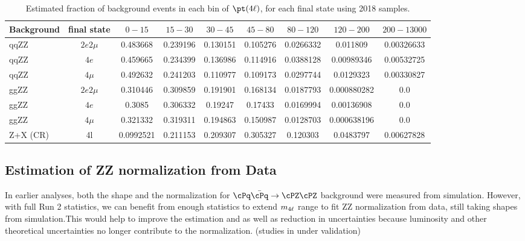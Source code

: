 \begin{table}[!h!tb]
\begin{center}
\scriptsize
    \caption{
        Estimated fraction of background events in each bin of $\pt(4\ell)$, for each final state using 2018 samples.
\label{tab:fractions_pT4l}
}
\begin{tabular}{|l|c|c|c|c|c|c|c|c|}
\hline
Background & final state & $0-15$ & $15-30$ & $30-45$ & $45-80$ & $80-120$ & $120-200$ & $200-13000$ \\ \hline
qqZZ& $2e2\mu$  & 0.483668  & 0.239196  & 0.130151  & 0.105276 & 0.0266332  & 0.011809  & 0.00326633 \\
qqZZ& $4e$  & 0.459665  & 0.234399  & 0.136986  & 0.114916 & 0.0388128  & 0.00989346  & 0.00532725 \\
qqZZ& $4\mu$  & 0.492632  & 0.241203  & 0.110977  & 0.109173 & 0.0297744  & 0.0129323  & 0.00330827 \\
\hline
ggZZ& $2e2\mu$  &  0.310446 & 0.309859  & 0.191901  & 0.168134 & 0.0187793  & 0.000880282  & 0.0 \\
ggZZ& $4e$  & 0.3085  & 0.306332  & 0.19247  & 0.17433 & 0.0169994  & 0.00136908  & 0.0 \\
ggZZ& $4\mu$  & 0.321332  & 0.319311  & 0.194863  & 0.150987 & 0.0128703  & 0.000638196  & 0.0 \\
\hline
Z+X (CR)& 4l  & 0.0992521  & 0.211153  & 0.209307 & 0.305327  & 0.120303  & 0.0483797 & 0.00627828 \\
\hline
\end{tabular}
\normalsize
\end{center}
\end{table}


\subsection{Estimation of ZZ normalization from Data}
In earlier analyses, both the shape and the normalization for $\qqZZ$ background were measured from simulation. 
	However, with full Run 2 statistics, we can benefit from enough statistics to extend $m_{4\ell}$ range to fit ZZ normalization from data, still taking shapes from simulation.This would help to improve the estimation and as well as reduction in uncertainties because luminosity and other theoretical uncertainties no longer contribute to the normalization. (studies in under validation)  

